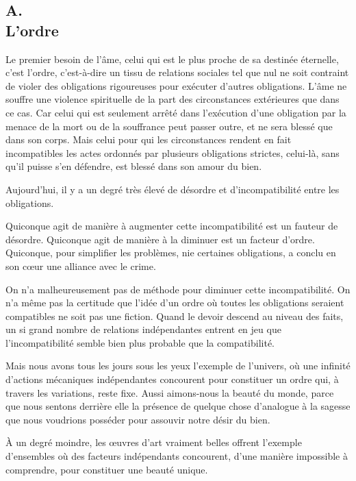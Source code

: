 \documentclass[french,twoside]{book} %
\begin{document}
\subsection[A. L'ordre]{A. \\
L'ordre}
\noindent \par
Le premier besoin de l'âme, celui qui est le plus proche de sa destinée éternelle, c'est l'ordre, c'est-à-dire un tissu de relations sociales tel que nul ne soit contraint de violer des obligations rigoureuses pour exécuter d'autres obligations. L'âme ne souffre une violence spirituelle de la part des circonstances extérieures que dans ce cas. Car celui qui est seulement arrêté dans l'exécution d'une obligation par la menace de la mort ou de la souffrance peut passer outre, et ne sera blessé que dans son corps. Mais celui pour qui les circonstances rendent en fait incompatibles les actes ordonnés par plusieurs obligations strictes, celui-là, sans qu'il puisse s'en défendre, est blessé dans son amour du bien.\par
Aujourd'hui, il y a un degré très élevé de désordre et d'incompatibilité entre les obligations.\par
Quiconque agit de manière à augmenter cette incompatibilité est un fauteur de désordre. Quiconque agit de manière à la diminuer est un facteur d'ordre. Quiconque, pour simplifier les problèmes, nie certaines obligations, a conclu en son cœur une alliance avec le crime.\par
On n'a malheureusement pas de méthode pour diminuer cette incompatibilité. On n'a même pas la certitude que l'idée d'un ordre où toutes les obligations seraient compatibles ne soit pas une fiction. Quand le devoir descend au niveau des faits, un si grand nombre de relations indépendantes entrent en jeu que l'incompatibilité semble bien plus probable que la compatibilité.\par
Mais nous avons tous les jours sous les yeux l'exemple de l'univers, où une infinité d'actions mécaniques indépendantes concourent pour constituer un ordre qui, à travers les variations, reste fixe. Aussi aimons-nous la beauté du monde, parce que nous sentons derrière elle la présence de quelque chose d'analogue à la sagesse que nous voudrions posséder pour assouvir notre désir du bien.\par
À un degré moindre, les œuvres d'art vraiment belles offrent l'exemple d'ensembles où des facteurs indépendants concourent, d'une manière impossible à comprendre, pour constituer une beauté unique.\par
\end{document}

